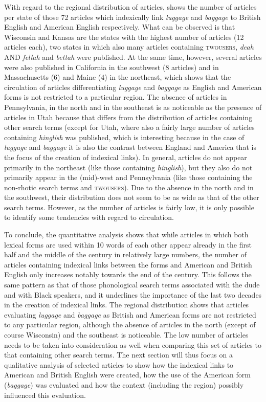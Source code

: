 With regard to the regional distribution of articles,  shows the number of articles per state of those 72 articles which indexically link \emph{luggage} and \emph{baggage} to British English and American English respectively. What can be observed is that Wisconsin and Kansas are the states with the highest number of articles (12 articles each), two states in which also many articles containing \textsc{twousers}, \emph{deah} AND \emph{fellah} and \emph{bettah} were published. At the same time, however, several articles were also published in California in the southwest (8 articles) and in Massachusetts (6) and Maine (4) in the northeast, which shows that the circulation of articles differentiating \emph{luggage} and \emph{baggage} as English and American forms is not restricted to a particular region. The absence of articles in Pennsylvania, in the north and in the southeast is as noticeable as the presence of articles in Utah because that differs from the distribution of articles containing other search terms (except for Utah, where also a fairly large number of articles containing \emph{hinglish} was published, which is interesting because in the case of \emph{luggage} and \emph{baggage} it is also the contrast between England and America that is the focus of the creation of indexical links). In general, articles do not appear primarily in the northeast (like those containing \emph{hinglish}), but they also do not primarily appear in the (mid)-west and Pennsylvania (like those containing the non-rhotic search terms and \textsc{twousers}). Due to the absence in the north and in the southwest, their distribution does not seem to be as wide as that of the other search terms. However, as the number of articles is fairly low, it is only possible to identify some tendencies with regard to circulation.




To conclude, the quantitative analysis shows that while articles in which both lexical forms are used within 10 words of each other appear already in the first half and the middle of the century in relatively large numbers, the number of articles containing indexical links between the forms and American and British English only increases notably towards the end of the century. This follows the same pattern as that of those phonological search terms associated with the dude and with Black speakers, and it underlines the importance of the last two decades in the creation of indexical links. The regional distribution shows that articles evaluating \emph{luggage} and \emph{baggage} as British and American forms are not restricted to any particular region, although the absence of articles in the north (except of course Wisconsin) and the southeast is noticeable. The low number of articles needs to be taken into consideration as well when comparing this set of articles to that containing other search terms. The next section will thus focus on a qualitative analysis of selected articles to show how the indexical links to American and British English were created, how the use of the American form (\emph{baggage}) was evaluated and how the context (including the region) possibly influenced this evaluation.


